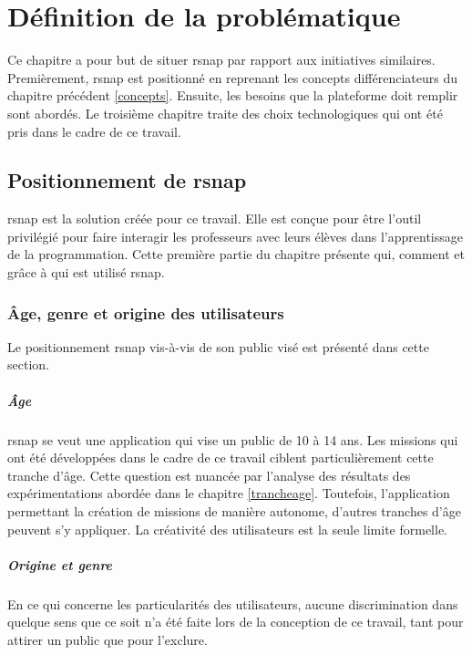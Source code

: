 ﻿\chapter{Définition de la problématique}
Ce chapitre a pour but de situer \gls{rsnap} par rapport aux initiatives similaires. Premièrement, \gls{rsnap} est positionné en reprenant les concepts différenciateurs du chapitre précédent \ref{concepts}. Ensuite, les besoins que la plateforme doit remplir sont abordés. Le troisième chapitre traite des choix technologiques qui ont été pris dans le cadre de ce travail.

\section{Positionnement de \gls{rsnap}}
\label{positionnement}
\gls{rsnap} est la solution créée pour ce travail. Elle est conçue pour être l'outil privilégié pour faire interagir les professeurs avec leurs élèves dans l'apprentissage de la programmation.
Cette première partie du chapitre présente qui, comment et grâce à qui est utilisé \gls{rsnap}.

\subsection{Âge, genre et origine des utilisateurs}
Le positionnement \gls{rsnap} vis-à-vis de son public visé est présenté dans cette section.

\paragraph{Âge}
\gls{rsnap} se veut une application qui vise un public de 10 à 14 ans. Les \glspl{mission} qui ont été développées dans le cadre de ce travail ciblent particulièrement cette tranche d'âge. Cette question est nuancée par l'analyse des résultats des expérimentations abordée dans le chapitre \ref{trancheage}.
Toutefois, l'application permettant la création de \glspl{mission} de manière autonome, d'autres tranches d'âge peuvent s'y appliquer. La créativité des utilisateurs est la seule limite formelle.

\paragraph{Origine et genre}
En ce qui concerne les particularités des utilisateurs, aucune discrimination dans quelque sens que ce soit n'a été faite lors de la conception de ce travail, tant pour attirer un public que pour l'exclure.

